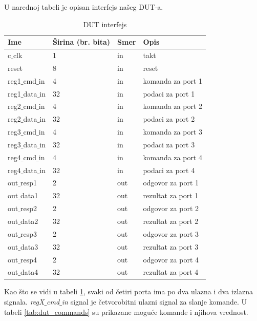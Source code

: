 U narednoj tabeli je opisan interfejs našeg DUT-a.\\

\begin{table}[h!]
  \centering
  \begin{tabular}{|l|l|l|l|}
    \hline
    \textbf{Ime} & \textbf{Širina (br. bita)} & \textbf{Smer} & \textbf{Opis}\\
    \hline
    c\(\_\)clk & 1 & in & takt\\
    \hline
    reset & 8 & in & reset\\
    \hline
    reg1\(\_\)cmd\(\_\)in & 4 & in & komanda za port 1\\
    \hline
    reg1\(\_\)data\(\_\)in & 32 & in & podaci za port 1\\
    \hline
    reg2\(\_\)cmd\(\_\)in & 4 & in & komanda za port 2\\
    \hline
    reg2\(\_\)data\(\_\)in & 32 & in & podaci za port 2\\
    \hline
    reg3\(\_\)cmd\(\_\)in & 4 & in & komanda za port 3\\
    \hline
    reg3\(\_\)data\(\_\)in & 32 & in & podaci za port 3\\
    \hline
    reg4\(\_\)cmd\(\_\)in & 4 & in & komanda za port 4\\
    \hline
    reg4\(\_\)data\(\_\)in & 32 & in & podaci za port 4\\
    \hline
    out\(\_\)resp1 & 2 & out & odgovor za port 1\\
    \hline
    out\(\_\)data1 & 32 & out & rezultat za port 1\\
    \hline
    out\(\_\)resp2 & 2 & out & odgovor za port 2\\
    \hline
    out\(\_\)data2 & 32 & out & rezultat za port 2\\
    \hline
    out\(\_\)resp3 & 2 & out & odgovor za port 3\\
    \hline
    out\(\_\)data3 & 32 & out & rezultat za port 3\\
    \hline
    out\(\_\)resp4 & 2 & out & odgovor za port 4\\
    \hline
    out\(\_\)data4 & 32 & out & rezultat za port 4\\
    \hline
  \end{tabular}
  \caption{DUT interfejs}
  \label{tab:dut_if}
\end{table}

Kao što se vidi u tabeli \ref{tab:dut_if}, svaki od četiri porta ima po dva
ulazna i dva izlazna signala. \emph{regX\(\_\)cmd\(\_\)in} signal je
četvorobitni ulazni signal za slanje komande. U tabeli \ref{tab:dut_commands} su
prikazane moguće komande i njihova vrednost.\\


